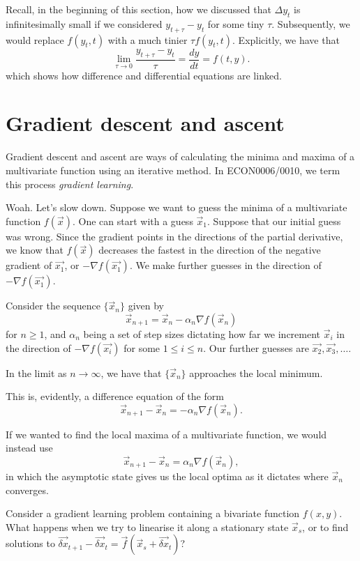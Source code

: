 \documentclass[a4paper, 12pt,oneside,openany]{book}
\begin{document}
Recall, in the beginning of this section, how we discussed that $\Delta y_t$ is infinitesimally small if we considered $y_{t+\tau}-y_t$ for some tiny $\tau$. Subsequently, we would replace $f(y_t, t)$ with a much tinier $\tau f(y_t, t)$. Explicitly, we have that $$\lim\limits_{\tau \to 0} \frac{y_{t+\tau}-y_t}{\tau} = \frac{dy}{dt} = f(t, y).$$ which shows how difference and differential equations are linked. 

\section{Gradient descent and ascent}

Gradient descent and ascent are ways of calculating the minima and maxima of a multivariate function using an iterative method. In ECON0006/0010, we term this process \emph{gradient learning}.

Woah. Let's slow down. Suppose we want to guess the minima of a multivariate function $f(\vec{x})$. One can start with a guess $\vec{x}_1$. Suppose that our initial guess was wrong. Since the gradient points in the directions of the partial derivative, we know that $f(\vec{x})$ decreases the fastest in the direction of the negative gradient of $\vec{x_1}$, or $-\nabla f(\vec{x_1})$. We make further guesses in the direction of $-\nabla f(\vec{x_1})$.

Consider the sequence $\{\vec{x}_n\}$ given by $$\vec{x}_{n+1} = \vec{x}_n - \alpha_n \nabla f(\vec{x}_n)$$ for $n\geq 1$, and $\alpha_n$ being a set of step sizes dictating how far we increment $\vec{x}_i$ in the direction of $-\nabla f(\vec{x_i})$ for some $1 \leq i \leq n$. Our further guesses are $\vec{x_2}, \vec{x_3}, \dots$.

In the limit as $n \to \infty$, we have that $\{\vec{x}_n\}$ approaches the local minimum. 

This is, evidently, a difference equation of the form $$\vec{x}_{n+1} - \vec{x}_n = - \alpha_n \nabla f(\vec{x}_n).$$

If we wanted to find the local maxima of a multivariate function, we would instead use $$\vec{x}_{n+1} - \vec{x}_n = \alpha_n \nabla f(\vec{x}_n),$$ in which the asymptotic state gives us the local optima as it dictates where $\vec{x}_n$ converges.

Consider a gradient learning problem containing a bivariate function $f(x, y)$. What happens when we try to linearise it along a stationary state $\vec{x}_s$, or to find solutions to $\vec{\delta x}_{t+1}-\vec{\delta x}_t = \vec{f}(\vec{x}_s + \vec{\delta x}_t)$?
\end{document}
